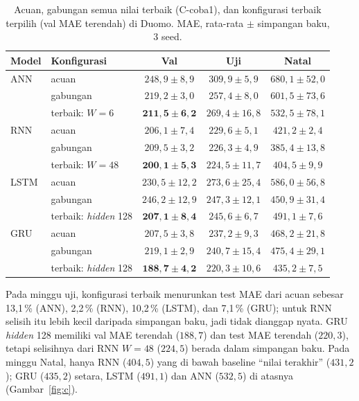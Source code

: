 \documentclass[conference,a4paper]{IEEEtran}
\begin{document}
\begin{table}[t]
  \centering
  \caption{Acuan, gabungan semua nilai terbaik (C-coba1), dan konfigurasi terbaik terpilih (val MAE terendah) di Duomo. MAE, rata-rata $\pm$ simpangan baku, 3 seed.}
  \label{tab:c}
  \scriptsize
  \setlength{\tabcolsep}{2.5pt}
  \begin{tabular}{@{}llccc@{}}
    \toprule
    Model & Konfigurasi & Val & Uji & Natal \\
    \midrule
    ANN  & acuan & $248{,}9 \pm 8{,}9$ & $309{,}9 \pm 5{,}9$ & $680{,}1 \pm 52{,}0$ \\
         & gabungan & $219{,}2 \pm 3{,}0$ & $257{,}4 \pm 8{,}0$ & $601{,}5 \pm 73{,}6$ \\
         & terbaik: $W=6$ & $\mathbf{211{,}5 \pm 6{,}2}$ & $269{,}4 \pm 16{,}8$ & $532{,}5 \pm 78{,}1$ \\
    RNN  & acuan & $206{,}1 \pm 7{,}4$ & $229{,}6 \pm 5{,}1$ & $421{,}2 \pm 2{,}4$ \\
         & gabungan & $209{,}5 \pm 3{,}2$ & $226{,}3 \pm 4{,}9$ & $385{,}4 \pm 13{,}8$ \\
         & terbaik: $W=48$ & $\mathbf{200{,}1 \pm 5{,}3}$ & $224{,}5 \pm 11{,}7$ & $404{,}5 \pm 9{,}9$ \\
    LSTM & acuan & $230{,}5 \pm 12{,}2$ & $273{,}6 \pm 25{,}4$ & $586{,}0 \pm 56{,}8$ \\
         & gabungan & $246{,}2 \pm 12{,}9$ & $247{,}3 \pm 12{,}1$ & $450{,}9 \pm 31{,}4$ \\
         & terbaik: \textit{hidden} 128 & $\mathbf{207{,}1 \pm 8{,}4}$ & $245{,}6 \pm 6{,}7$ & $491{,}1 \pm 7{,}6$ \\
    GRU  & acuan & $207{,}5 \pm 3{,}8$ & $237{,}2 \pm 9{,}3$ & $468{,}2 \pm 21{,}8$ \\
         & gabungan & $219{,}1 \pm 2{,}9$ & $240{,}7 \pm 15{,}4$ & $475{,}4 \pm 29{,}1$ \\
         & terbaik: \textit{hidden} 128 & $\mathbf{188{,}7 \pm 4{,}2}$ & $220{,}3 \pm 10{,}6$ & $435{,}2 \pm 7{,}5$ \\
    \bottomrule
  \end{tabular}
\end{table}

Pada minggu uji, konfigurasi terbaik menurunkan test MAE dari acuan sebesar 13,1\,\% (ANN), 2,2\,\% (RNN), 10,2\,\% (LSTM), dan 7,1\,\% (GRU); untuk RNN selisih itu lebih kecil daripada simpangan baku, jadi tidak dianggap nyata. GRU \textit{hidden} 128 memiliki val MAE terendah ($188{,}7$) dan test MAE terendah ($220{,}3$), tetapi selisihnya dari RNN $W=48$ ($224{,}5$) berada dalam simpangan baku. Pada minggu Natal, hanya RNN ($404{,}5$) yang di bawah baseline ``nilai terakhir'' ($431{,}2$); GRU ($435{,}2$) setara, LSTM ($491{,}1$) dan ANN ($532{,}5$) di atasnya (Gambar~\ref{fig:c}).
\end{document}
